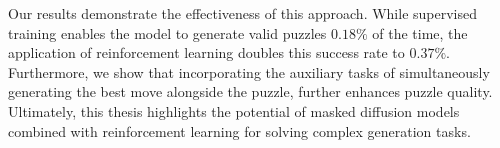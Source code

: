 \documentclass[english, 12pt, a4paper, sci, utf8, a-2b, online]{aaltothesis}
\theoremstyle{definition}
\theoremstyle{plain}
\theoremstyle{remark}
\begin{document}
\begin{abstractpage}
    Our results demonstrate the effectiveness of this approach. While supervised training enables the model to generate valid puzzles $0.18\%$ of the time, the application of reinforcement learning doubles this success rate to $0.37\%$. Furthermore, we show that incorporating the auxiliary tasks of simultaneously generating the best move alongside the puzzle, further enhances puzzle quality. Ultimately, this thesis highlights the potential of masked diffusion models combined with reinforcement learning for solving complex generation tasks.
\end{abstractpage}

\end{document}
